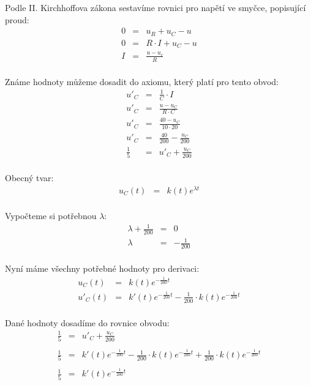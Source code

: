 \documentclass[a4paper,oneside,13pt]{article}
\begin{document}
	Podle \RN{2}. Kirchhoffova zákona sestavíme rovnici pro napětí ve smyčce, popisující proud:
	\begin{eqnarray*}
		0 & = & u_{R} + u_{C} - u \\
		0 & = & R \cdot I + u_{C} - u \\
		I & = & \frac{u - u_{c}}{R} \\
	\end{eqnarray*}

	Známe hodnoty můžeme dosadit do axiomu, který platí pro tento obvod:
	\begin{eqnarray*}
		u'_{C} & = & \frac{1}{C} \cdot I \\
		u'_{C} & = & \frac{u - u_{C}}{R \cdot C} \\
		u'_{C} & = & \frac{40 - u_{C}}{10 \cdot 20} \\
		u'_{C} & = & \frac{40}{200} - \frac{u_{C}}{200} \\
		\frac{1}{5} & = & u'_{C} + \frac{u_{C}}{200} \\
	\end{eqnarray*}
	
	Obecný tvar: 
	\begin{eqnarray*}
		u_{C}(t) & = & k(t)e^{\lambda t} \\
	\end{eqnarray*}

	Vypočteme si potřebnou $\lambda$:
	\begin{eqnarray*}
		\lambda + \frac{1}{200} & = & 0 \\
		\lambda & = & -\frac{1}{200} \\
	\end{eqnarray*}

	Nyní máme všechny potřebné hodnoty pro derivaci:
	\begin{eqnarray*}
		u_{C}(t) & = & k(t)e^{-\frac{1}{200}t} \\
		u'_{C}(t) & = & k'(t)e^{-\frac{1}{200}t} - \frac{1}{200} \cdot k(t)e^{-\frac{1}{200}t} \\
	\end{eqnarray*}

	Dané hodnoty dosadíme do rovnice obvodu:
	\begin{eqnarray*}
		 \frac{1}{5} & = & u'_{C} + \frac{u_{C}}{200} \\ \\
		 \frac{1}{5} & = & k'(t)e^{-\frac{1}{200}t} - \frac{1}{200} \cdot k(t)e^{-\frac{1}{200}t} +  \frac{1}{200} \cdot k(t)e^{-\frac{1}{200}t} \\ \\
		 \frac{1}{5} & = & k'(t)e^{-\frac{1}{200}t} \\
	\end{eqnarray*}
\end{document}

